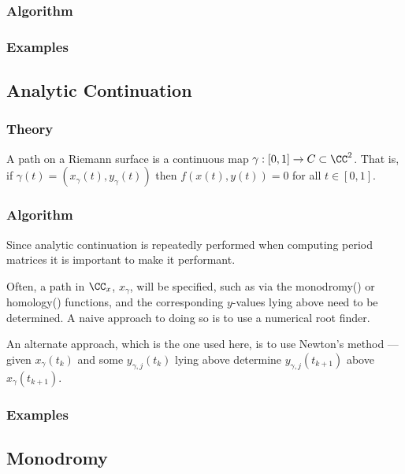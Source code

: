 %
\subsubsection*{Algorithm}
%
%
\subsubsection*{Examples}
%

\subsection{Analytic Continuation}

%
\subsubsection*{Theory}
%

A path on a Riemann surface is a continuous map $\gamma : [0,1] \to C
\subset \CC^2$. That is, if $\gamma(t) = (x_\gamma(t), y_\gamma(t))$
then $f(x(t),y(t)) = 0$ for all $t \in [0,1]$.


%
\subsubsection*{Algorithm}
%

Since analytic continuation is repeatedly performed when computing
period matrices it is important to make it performant.

Often, a path in $\CC_x$, $x_\gamma$, will be specified, such as via the
{\sc monodromy() or homology()} functions, and the corresponding
$y$-values lying above need to be determined. A naive approach to doing
so is to use a numerical root finder.

An alternate approach, which is the one used here, is to use Newton's
method --- given $x_\gamma(t_k)$ and some $y_{\gamma,j}(t_k)$ lying
above determine $y_{\gamma,j}(t_{k+1})$ above $x_\gamma(t_{k+1})$.

%
\subsubsection*{Examples}
%

\subsection{Monodromy}


